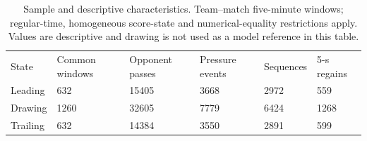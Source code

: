 \begin{table}[ht]
\centering
\small
\caption{Sample and descriptive characteristics. Team--match five-minute windows; regular-time, homogeneous score-state and numerical-equality restrictions apply. Values are descriptive and drawing is not used as a model reference in this table.}
\begin{tabular}{llllll}
\hline
State & Common windows & Opponent passes & Pressure events & Sequences & 5-s regains \\
Leading & 632 & 15405 & 3668 & 2972 & 559 \\
Drawing & 1260 & 32605 & 7779 & 6424 & 1268 \\
Trailing & 632 & 14384 & 3550 & 2891 & 599 \\
\hline
\end{tabular}
\end{table}

